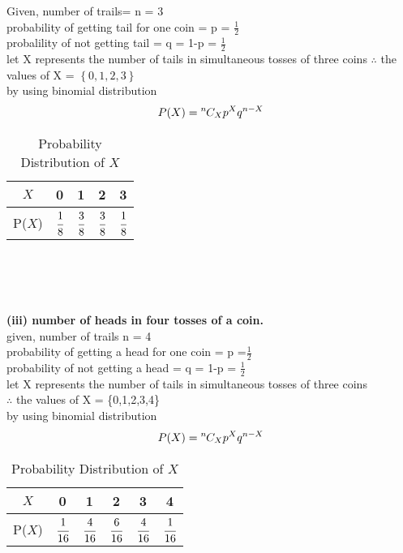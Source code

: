 \documentclass{article}
\providecommand{\cbrak}[1]{\ensuremath{\left\{#1\right\}}}
\newcommand*{\permcomb}[4][0mu]{{{}^{#3}\mkern#1#2_{#4}}}
\newcommand*{\comb}[1][-1mu]{\permcomb[#1]{C}}
\newcommand\T{\rule{0pt}{2.6ex}}       %
\begin{document}
\begin{enumerate}[label=13.\arabic{enumi}.\arabic{enumii}]
Given, number of trails= n = 3\\
probability of getting tail for one coin = p = $\frac{1}{2}$\\
probalility of not getting tail =  q = 1-p = $\frac{1}{2}$\\
let X represents the number of tails in simultaneous tosses of three coins
 $\therefore$ the values of X = \cbrak{0,1,2,3}\\
 by using binomial distribution\\
 \begin{align}
 P(X) = \comb{n}{X}p^Xq^{n-X}
 \end{align}
	\begin{table}[ht]
	\normalsize
	\centering
			\begin{tabular}[20pt]{|c|c|c|c|c|} \hline		%
			$X$&0&1&2&3 \T \\ \hline
			P($X$)&$\cfrac{1}{8}$&$\cfrac{3}{8}$&$\cfrac{3}{8}$&$\cfrac{1}{8}$\\[1.5ex] \hline
		\end{tabular}\\[2ex]
		\caption{Probability Distribution of $X$}
	\end{table}\\\\
\textbf{(iii) number of heads in four tosses of a coin.\\}
given, number of trails n = 4\\
probability of getting a head for one coin = p =$\frac{1}{2}$\\
probability of not getting a head = q = 1-p = $\frac{1}{2}$\\
let X represents the number of tails in simultaneous tosses of three coins\\
 $\therefore$ the values of X = \{0,1,2,3,4\}\\
 by using binomial distribution\\
 \begin{align}
 P(X) = \comb{n}{X}p^Xq^{n-X}
 \end{align}

	\begin{table}[h]
	\normalsize
	\centering
			\begin{tabular}[20pt]{|c|c|c|c|c|c|} \hline		%
			$X$&0&1&2&3&4 \T \\ \hline
			P($X$)&$\cfrac{1}{16}$&$\cfrac{4}{16}$&$\cfrac{6}{16}$&$\cfrac{4}{16}$&$\cfrac{1}{16}$\\[1.5ex] \hline
		\end{tabular}\\[2ex]
		\caption{Probability Distribution of $X$}
	\end{table}
\end{enumerate}
\end{document}
